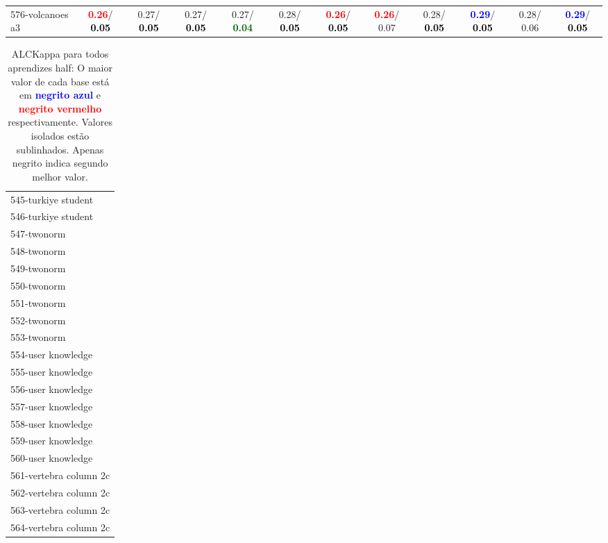\begin{table}[h]
\begin{center}
{\begin{tabular}{lc|c|c|c|c|c|c|c|c|c|c}
576-volcanoes a3 & \textcolor{red}{\textbf{  0.26}}/\textcolor{black}{\textbf{  0.05}} &   0.27/\textcolor{black}{\textbf{  0.05}} &   0.27/\textcolor{black}{\textbf{  0.05}} &   0.27/\textcolor{darkgreen}{\textbf{  0.04}} &   0.28/\textcolor{black}{\textbf{  0.05}} & \textcolor{red}{\textbf{  0.26}}/\textcolor{black}{\textbf{  0.05}} & \textcolor{red}{\textbf{  0.26}}/  0.07 &   0.28/\textcolor{black}{\textbf{  0.05}} & \textcolor{blue}{\textbf{  0.29}}/\textcolor{black}{\textbf{  0.05}} &   0.28/  0.06 & \textcolor{blue}{\textbf{  0.29}}/\textcolor{black}{\textbf{  0.05}} \\\end{tabular}}\label{stratsALCKappa17AllReduxa}
\end{center}
\end{table}
\begin{table}[h]
\caption{ALCKappa para todos aprendizes half: O maior valor de cada base está em \textcolor{blue}{\textbf{negrito azul}} e \textcolor{red}{\textbf{negrito vermelho}} respectivamente. Valores isolados estão sublinhados. Apenas negrito indica segundo melhor valor.}
\begin{center}\begin{tabular}{l}
 & \\ \hline 545-turkiye student &  \\
546-turkiye student &  \\
547-twonorm &  \\
548-twonorm &  \\
549-twonorm &  \\
550-twonorm &  \\
551-twonorm &  \\ \hline
552-twonorm &  \\
553-twonorm &  \\
554-user knowledge &  \\
555-user knowledge &  \\
556-user knowledge &  \\
557-user knowledge &  \\
558-user knowledge &  \\ \hline
559-user knowledge &  \\
560-user knowledge &  \\
561-vertebra column 2c &  \\
562-vertebra column 2c &  \\
563-vertebra column 2c &  \\
564-vertebra column 2c &  \\

\end{tabular}
\end{center}
\end{table}
